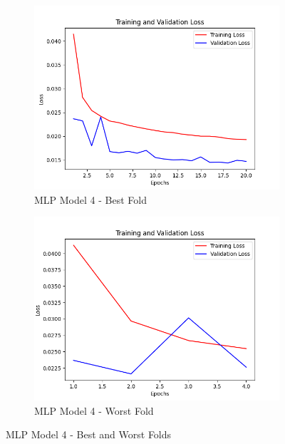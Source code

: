 \begin{figure}[H]
    \centering
    \begin{subfigure}{0.45\textwidth}
        \includegraphics[width=\textwidth]{Appendices/Images/MLP/Model4/MLP_Fold_4_Loss.png}
        \caption{MLP Model 4 - Best Fold}
        \label{fig:mlp_model4_best_fold}
    \end{subfigure}
    \hfill
    \begin{subfigure}{0.45\textwidth}
        \includegraphics[width=\textwidth]{Appendices/Images/MLP/Model4/MLP_Fold_6_Loss.png}
        \caption{MLP Model 4 - Worst Fold}
        \label{fig:mlp_model4_worst_fold}
    \end{subfigure}
    \caption{MLP Model 4 - Best and Worst Folds}
    \label{fig:mlp_model4_folds}
\end{figure}

